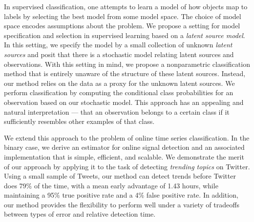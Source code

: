 
In supervised classification, one attempts to learn a model of how objects map
to labels by selecting the best model from some model space. The choice of model
space encodes assumptions about the problem. We propose a setting for model
specification and selection in supervised learning based on a {\em latent source
model}. In this setting, we specify the model by a small collection of unknown
{\em latent sources} and posit that there is a stochastic model relating latent
sources and observations. With this setting in mind, we propose a nonparametric
classification method that is entirely unaware of the structure of these latent
sources. Instead, our method relies on the data as a proxy for the unknown
latent sources. We perform classification by computing the conditional class
probabilities for an observation based on our stochastic model. This approach
has an appealing and natural interpretation --- that an observation belongs
to a certain class if it sufficiently resembles other examples of that class.

We extend this approach to the problem of online time series classification. In
the binary case, we derive an estimator for online signal detection and an
associated implementation that is simple, efficient, and scalable. We
demonstrate the merit of our approach by applying it to the task of detecting
{\em trending topics} on Twitter. Using a small sample of Tweets, our method can
detect trends before Twitter does 79\% of the time, with a mean early advantage
of 1.43 hours, while maintaining a 95\% true positive rate and a 4\% false
positive rate. In addition, our method provides the flexibility to perform well
under a variety of tradeoffs between types of error and relative detection time.



